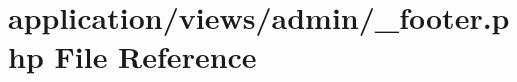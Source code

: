 \hypertarget{admin_2__footer_8php}{\section{application/views/admin/\-\_\-footer.php File Reference}
\label{admin_2__footer_8php}
}
